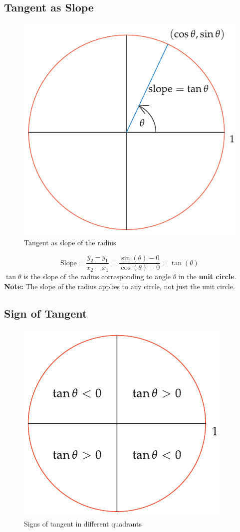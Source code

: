 \subsection{Tangent as Slope}
\begin{figure}
    \centering
    \includegraphics[scale=0.2]{pics/9.png}
    \caption{Tangent as slope of the radius}
\end{figure}
\[ \text{Slope} = \frac{y_{2} - y_{1}}{x_{2} - x_{1}} = \frac{\sin(\theta) - 0}{\cos(\theta) - 0} = \tan(\theta) \]
$\tan \theta$ is the slope of the radius corresponding to angle $\theta$ in the \textbf{unit circle}.
\textbf{Note:} The slope of the radius applies to any circle, not just the unit circle.

\subsection{Sign of Tangent}
\begin{figure}
    \centering
    \includegraphics[scale=0.2]{pics/10.png}
    \caption{Signs of tangent in different quadrants}
\end{figure}

